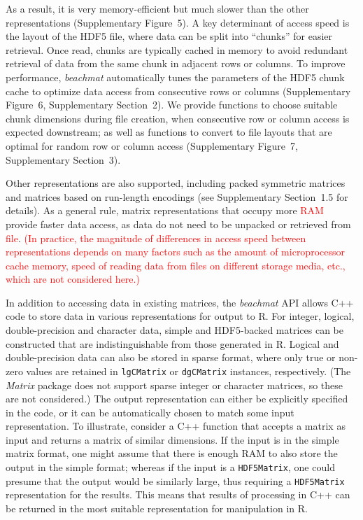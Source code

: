 \documentclass[10pt,letterpaper]{article}
\newcommand{\suppfighdfspeed}{5}
\newcommand{\suppfighdflayout}{6}
\newcommand{\suppfighdfrandom}{7}
\newcommand{\suppsecother}{1.5}
\newcommand{\suppseclayoutoptim}{2}
\newcommand{\suppseclayoutrandom}{3}
\newcommand{\beachmat}{\textit{beachmat}}
\newcommand{\code}[1]{\texttt{#1}}
\newcommand{\revised}[1]{\textcolor{red}{#1}}
\begin{document}
\begin{itemize}
        As a result, it is very memory-efficient but much slower than the other representations (Supplementary Figure~\suppfighdfspeed{}).
        A key determinant of access speed is the layout of the HDF5 file, where data can be split into ``chunks'' for easier retrieval.
        Once read, chunks are typically cached in memory to avoid redundant retrieval of data from the same chunk in adjacent rows or columns.
        To improve performance, \beachmat{} automatically tunes the parameters of the HDF5 chunk cache to optimize data access from consecutive rows or columns (Supplementary Figure~\suppfighdflayout{}, Supplementary Section~\suppseclayoutoptim{}).
        We provide functions to choose suitable chunk dimensions during file creation, when consecutive row or column access is expected downstream;
        as well as functions to convert to file layouts that are optimal for random row or column access (Supplementary Figure~\suppfighdfrandom{}, Supplementary Section~\suppseclayoutrandom{}).
\end{itemize}
Other representations are also supported, including packed symmetric matrices and matrices based on run-length encodings (see Supplementary Section~\suppsecother{} for details).
As a general rule, matrix representations that occupy more \revised{RAM} provide faster data access, as data do not need to be unpacked or retrieved from \revised{file}.
\revised{(In practice, the magnitude of differences in access speed between representations depends on many factors such as the amount of microprocessor cache memory, speed of reading data from files on different storage media, etc., which are not considered here.)}

In addition to accessing data in existing matrices, the \beachmat{} API allows C++ code to store data in various representations for output to R.
For integer, logical, double-precision and character data, simple and HDF5-backed matrices can be constructed that are indistinguishable from those generated in R.
Logical and double-precision data can also be stored in sparse format, where only true or non-zero values are retained in \code{lgCMatrix} or \code{dgCMatrix} instances, respectively.
(The \textit{Matrix} package does not support sparse integer or character matrices, so these are not considered.)
The output representation can either be explicitly specified in the code, or it can be automatically chosen to match some input representation.
To illustrate, consider a C++ function that accepts a matrix as input and returns a matrix of similar dimensions.
If the input is in the simple matrix format, one might assume that there is enough RAM to also store the output in the simple format;
whereas if the input is a \code{HDF5Matrix}, one could presume that the output would be similarly large, thus requiring a \code{HDF5Matrix} representation for the results.
This means that results of processing in C++ can be returned in the most suitable representation for manipulation in R.
 
\end{document}

